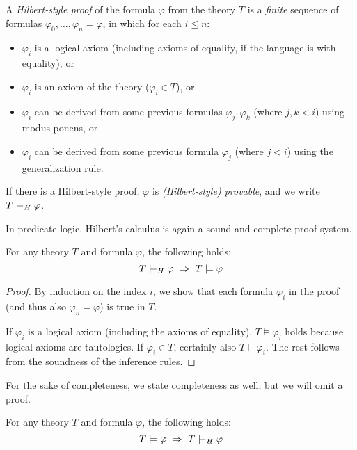 \begin{definition}
    A \emph{Hilbert-style proof} of the formula $\varphi$ from the theory $T$ is a \emph{finite} sequence of formulas $\varphi_0, \dots, \varphi_n=\varphi$, in which for each $i\le n$:
    \begin{itemize}
    \item $\varphi_i$ is a logical axiom (including axioms of equality, if the language is with equality), or
    \item $\varphi_i$ is an axiom of the theory ($\varphi_i \in T$), or
    \item $\varphi_i$ can be derived from some previous formulas $\varphi_j,\varphi_k$ (where $j,k<i$) using modus ponens, or
    \item $\varphi_i$ can be derived from some previous formula $\varphi_j$ (where $j<i$) using the generalization rule.
    \end{itemize}
    If there is a Hilbert-style proof, $\varphi$ is \emph{(Hilbert-style) provable}, and we write $T\proves_H\varphi$.           
\end{definition}

In predicate logic, Hilbert's calculus is again a sound and complete proof system.

\begin{theorem}
For any theory $T$ and formula $\varphi$, the following holds: 
$$
T\proves_H \varphi\ \Rightarrow\ T\models\varphi
$$ 
\end{theorem}
\begin{proof}
By induction on the index $i$, we show that each formula $\varphi_i$ in the proof (and thus also $\varphi_n=\varphi$) is true in $T$.

If $\varphi_i$ is a logical axiom (including the axioms of equality), $T \models \varphi_i$ holds because logical axioms are tautologies. If $\varphi_i\in T$, certainly also $T \models \varphi_i$. The rest follows from the soundness of the inference rules.
\end{proof}

For the sake of completeness, we state completeness as well, but we will omit a proof.

\begin{theorem}
For any theory $T$ and formula $\varphi$, the following holds: 
$$
T\models\varphi\ \Rightarrow\ T\proves_H\varphi
$$
\end{theorem}
